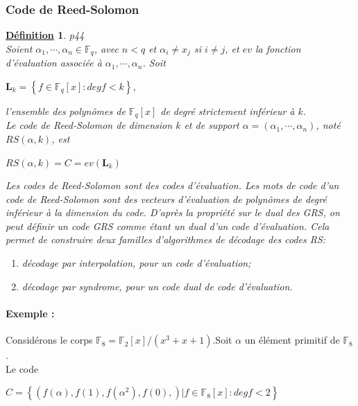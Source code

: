 \documentclass[12pt,openany]{report}
\newtheorem{definition}{\underline{Définition}}
\begin{document}
  \subsubsection{Code de Reed-Solomon}  
  \begin{definition}\cite{Ndollane}p44\\
  Soient $\alpha_1,\cdots,\alpha_n \in \mathbb{F}_q $, avec $n<q $ et 
  $ \alpha_i \neq x_j $ si $i \neq j $, et $ev$ la fonction d'évaluation associée à $\alpha_1,\cdots,\alpha_n  $. Soit \\
  \begin{center}
  $ \mathbf{L}_k=\left\lbrace f \in \mathbb{F}_q[x]: deg f <k \right\rbrace  $,
  \end{center}
  l'ensemble des polynômes de $\mathbb{F}_q[x] $ de degré strictement inférieur à $k$.\\
  Le code de Reed-Solomon de dimension $k$ et de support $\alpha=(\alpha_1,\cdots,\alpha_n) $, noté $RS(\alpha,k)$, est 
  \begin{center}
  $ RS(\alpha,k)=\mathit{C}= ev(\mathbf{L}_k)  $
  \end{center}
  Les codes de Reed-Solomon sont des codes d'évaluation. Les mots de code d'un code de Reed-Solomon sont des vecteurs d'évaluation de polynômes de degré inférieur à la dimension du code. D'après la propriété sur le dual des GRS, on peut définir un code GRS comme étant un dual d'un code d'évaluation. Cela permet de construire deux familles
  d'algorithmes de décodage des codes RS:
  \begin{enumerate}
  \item décodage par interpolation, pour un code d'évaluation;
  \item décodage par syndrome, pour un code dual de code d'évaluation.
  \end{enumerate}
  \end{definition}
  
  \paragraph{Exemple :\\}
  
  Considérons le corps $\mathbb{F}_8=\mathbb{F}_2[x]/(x^3+x+1)$.Soit $\alpha$ un élément primitif de $ \mathbb{F}_8$.\\
  Le code
  \begin{center}
  $ \mathit{C}=\left\lbrace \left(  f(\alpha),f(1),f(\alpha^2),f(0), \right) | f \in \mathbb{F}_8[x]: deg f <2  \right\rbrace  $
  
  \end{center}
  
\end{document}
